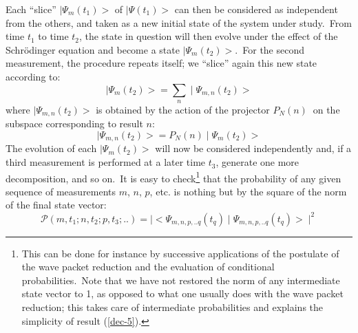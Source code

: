\documentclass[12pt,onecolumn]{article}%
\begin{document}
Each ``slice'' $\mid\Psi_{m}(t_{1})>$ of $\mid\Psi(t_{1})>$ can then be
considered as independent from the others, and taken as a new initial state of
the system under study.\ From time $t_{1}$ to time $t_{2}$, the state in
question will then evolve under the effect of the Schr\"{o}dinger equation and
become a state $\mid\Psi_{m}(t_{2})>$.\ For the second measurement, the
procedure repeats itself; we ``slice'' again this new state according to:%
\begin{equation}
\mid\Psi_{m}(t_{2})>=\sum_{n}\mid\Psi_{m,n}(t_{2})> \label{dec-3}%
\end{equation}
where $\mid\Psi_{m,n}(t_{2})>$ is obtained by the action of the projector
$P_{N}(n)$ $\ $on the subspace corresponding to result $n$:%
\begin{equation}
\mid\Psi_{m,n}(t_{2})>=P_{N}(n)\mid\Psi_{m}(t_{2})> \label{dec-4}%
\end{equation}
The evolution of each $\mid\Psi_{m}(t_{2})>$ will now be considered
independently and, if a third measurement is performed at a later time $t_{3}%
$, generate one more decomposition, and so on.\ It is easy to
check\footnote{This can be done for instance by successive applications of the
postulate of the wave packet reduction and the evaluation of conditional
probabilities.\ Note that we have not restored the norm of any intermediate
state vector to 1, as opposed to what one usually does with the wave packet
reduction; this takes care of intermediate probabilities and explains the
simplicity of result (\ref{dec-5}).} that the probability of any given
sequence of measurements $m$, $n$, $p$, etc. is nothing but by the square of
the norm of the final state vector:%
\begin{equation}
\mathcal{P}(m,t_{1};n,t_{2};p,t_{3};..)=\mid<\Psi_{m,n,p,..q}(t_{q})\mid
\Psi_{m,n,p,..q}(t_{q})>\mid^{2} \label{dec-5}%
\end{equation}
\end{document}
